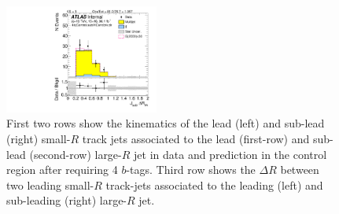 \begin{figure}[htbp!]
\begin{center}
\includegraphics[width=0.45\textwidth,angle=-90]{figures/boosted/Control/b77_FourTag_Control_sublHCand_trk_dr.pdf}
  \caption{First two rows show the kinematics of the lead (left) and sub-lead (right) small-$R$ track jets associated to the lead (first-row) and sub-lead (second-row) large-$R$ jet in data and prediction in the control region after requiring 4 $b$-tags. Third row shows the $\Delta R$ between two leading small-$R$ track-jets associated to the leading (left) and sub-leading (right) large-$R$ jet.  }
  \label{fig:boosted-4b-control-ak2}
\end{center}
\end{figure}


